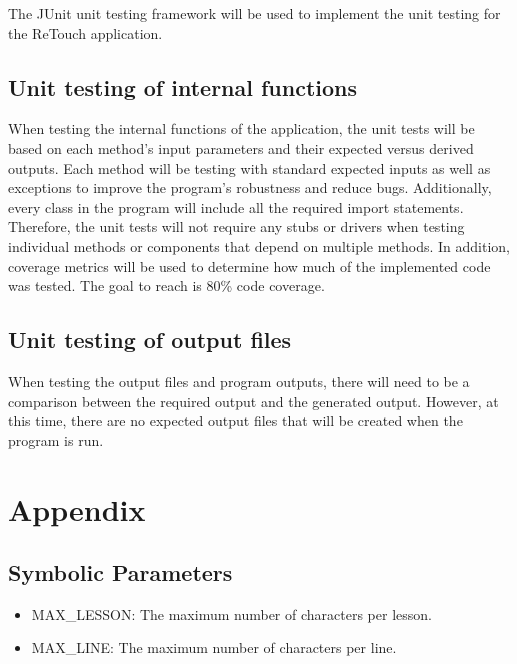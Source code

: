 \documentclass[12pt, titlepage]{article}
\begin{document}
The JUnit unit testing framework will be used to implement the unit testing for the ReTouch application.
		
\subsection{Unit testing of internal functions}

When testing the internal functions of the application, the unit tests will be based on each method's input parameters and their expected versus derived outputs. Each method will be testing with standard expected inputs as well as exceptions to improve the program's robustness and reduce bugs. Additionally, every class in the program will include all the required import statements. Therefore, the unit tests will not require any stubs or drivers when testing individual methods or components that depend on multiple methods. In addition, coverage metrics will be used to determine how much of the implemented code was tested. The goal to reach is 80\% code coverage. 
		
\subsection{Unit testing of output files}

When testing the output files and program outputs, there will need to be a comparison between the required output and the generated output. However, at this time, there are no expected output files that will be created when the program is run. 		

\newpage

\section{Appendix}

\subsection{Symbolic Parameters}
\label{symbols}

\begin{itemize}
\item MAX\_LESSON: The maximum number of characters per lesson.
\item MAX\_LINE: The maximum number of characters per line.
\end{itemize}
\end{document}
